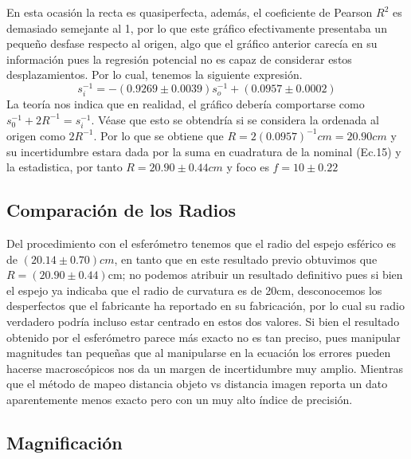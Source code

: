 \documentclass[article,12pt]{elsarticle}
\begin{document}
En esta ocasión la recta es quasiperfecta, además, el coeficiente de Pearson $R^2$ es demasiado semejante al 1, por lo que este gráfico efectivamente presentaba un pequeño desfase respecto al origen, algo que el gráfico anterior carecía en su información pues la regresión potencial no es capaz de considerar estos desplazamientos. Por lo cual, tenemos la siguiente expresión.
\begin{equation}
    s_i^{-1} = -(0.9269\pm0.0039)s_o^{-1} + (0.0957 \pm 0.0002)
\end{equation}
La teoría nos indica que en realidad, el gráfico debería comportarse como $s_0^{-1} + 2R^{-1} = s_{i}^{-1}$. Véase que esto se obtendría si se considera la ordenada al origen como $2R^{-1}$. Por lo que se obtiene que $R = 2(0.0957)^{-1}cm = 20.90 cm$ y su incertidumbre estara dada por la suma en cuadratura de la nominal (Ec.15) y la estadistica, por tanto $R=20.90 \pm 0.44cm $ y foco es $f=10 \pm 0.22$

\subsection{Comparación de los Radios}

Del procedimiento con el esferómetro tenemos que el radio del espejo esférico es de $(20.14 \pm 0.70)cm$, en tanto que en este resultado previo obtuvimos que $R=(20.90 \pm 0.44)$cm; no podemos atribuir un resultado definitivo pues si bien el espejo ya indicaba que el radio de curvatura es de 20cm, desconocemos los desperfectos que el fabricante ha reportado en su fabricación, por lo cual su radio verdadero podría incluso estar centrado en estos dos valores. Si bien el resultado obtenido por el esferómetro parece más exacto no es tan preciso, pues manipular magnitudes tan pequeñas que al manipularse en la ecuación los errores pueden hacerse macroscópicos nos da un margen de incertidumbre muy amplio. Mientras que el método de mapeo distancia objeto vs distancia imagen reporta un dato aparentemente menos exacto pero con un muy alto índice de precisión.

\subsection{Magnificación}
\end{document}
